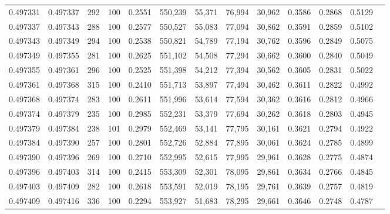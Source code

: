 \begin{tabular}{rrrrrrrrrrrrr}
0.497331 & 0.497337 &   292 & 100 &                                     0.2551 & 550,239 &  55,371 &  76,994 &  30,962 & 0.3586 & 0.2868 & 0.5129 \\
0.497337 & 0.497343 &   288 & 100 &                                     0.2577 & 550,527 &  55,083 &  77,094 &  30,862 & 0.3591 & 0.2859 & 0.5102 \\
0.497343 & 0.497349 &   294 & 100 &                                     0.2538 & 550,821 &  54,789 &  77,194 &  30,762 & 0.3596 & 0.2849 & 0.5075 \\
0.497349 & 0.497355 &   281 & 100 &                                     0.2625 & 551,102 &  54,508 &  77,294 &  30,662 & 0.3600 & 0.2840 & 0.5049 \\
0.497355 & 0.497361 &   296 & 100 &                                     0.2525 & 551,398 &  54,212 &  77,394 &  30,562 & 0.3605 & 0.2831 & 0.5022 \\
0.497361 & 0.497368 &   315 & 100 &                                     0.2410 & 551,713 &  53,897 &  77,494 &  30,462 & 0.3611 & 0.2822 & 0.4992 \\
0.497368 & 0.497374 &   283 & 100 &                                     0.2611 & 551,996 &  53,614 &  77,594 &  30,362 & 0.3616 & 0.2812 & 0.4966 \\
0.497374 & 0.497379 &   235 & 100 &                                     0.2985 & 552,231 &  53,379 &  77,694 &  30,262 & 0.3618 & 0.2803 & 0.4945 \\
0.497379 & 0.497384 &   238 & 101 &                                     0.2979 & 552,469 &  53,141 &  77,795 &  30,161 & 0.3621 & 0.2794 & 0.4922 \\
0.497384 & 0.497390 &   257 & 100 &                                     0.2801 & 552,726 &  52,884 &  77,895 &  30,061 & 0.3624 & 0.2785 & 0.4899 \\
0.497390 & 0.497396 &   269 & 100 &                                     0.2710 & 552,995 &  52,615 &  77,995 &  29,961 & 0.3628 & 0.2775 & 0.4874 \\
0.497396 & 0.497403 &   314 & 100 &                                     0.2415 & 553,309 &  52,301 &  78,095 &  29,861 & 0.3634 & 0.2766 & 0.4845 \\
0.497403 & 0.497409 &   282 & 100 &                                     0.2618 & 553,591 &  52,019 &  78,195 &  29,761 & 0.3639 & 0.2757 & 0.4819 \\
0.497409 & 0.497416 &   336 & 100 &                                     0.2294 & 553,927 &  51,683 &  78,295 &  29,661 & 0.3646 & 0.2748 & 0.4787 \\

\end{tabular}
